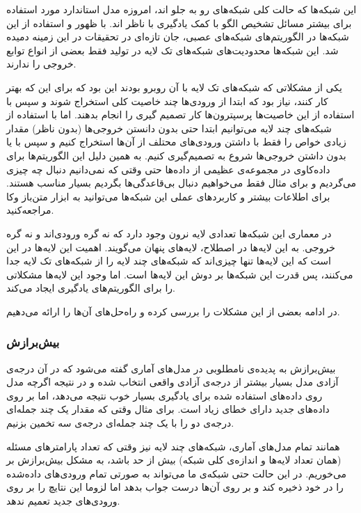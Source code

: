 \documentclass[11pt,a4paper,twocolumn]{article}
\begin{document}
این شبکه‌ها که حالت کلی شبکه‌های رو به جلو اند، امروزه مدل استاندارد مورد استفاده برای بیشتر مسائل تشخیص الگو با کمک یادگیری با ناظر اند. با ظهور و استفاده از این شبکه‌ها در الگوریتم‌های شبکه‌های عصبی، جان تازه‌ای در تحقیقات در این زمینه دمیده شد. این شبکه‌ها محدودیت‌های شبکه‌های تک لایه در تولید فقط بعضی از انواع توابع خروجی را ندارند.

یکی از مشکلاتی که شبکه‌های تک لایه با آن روبرو بودند این بود که برای این که بهتر کار کنند، نیاز بود که ابتدا از ورودی‌ها چند خاصیت کلی استخراج شوند و سپس با استفاده از این خاصیت‌ها پرسپترون‌ها کار تصمیم گیری را انجام بدهند. اما با استفاده از شبکه‌های چند لایه می‌توانیم ابتدا حتی بدون دانستن خروجی‌ها (بدون ناظر) مقدار زیادی خواص را فقط با داشتن ورودی‌های محتلف از آن‌ها استخراج کنیم و سپس با یا بدون داشتن خروجی‌ها شروع به تصمیم‌گیری کنیم. به همین دلیل این الگوریتم‌ها برای
داده‌کاوی
در مجموعه‌ی عظیمی از داده‌ها حتی وقتی که نمی‌دانیم دنبال چه چیزی می‌گردیم و برای مثال فقط می‌خواهیم دنبال بی‌قاعدگی‌ها بگردیم بسیار مناسب هستند. برای اطلاعات بیشتر و کاربرد‌های عملی این شبکه‌ها می‌توانید به ابزار متن‌باز
وکا
مراجعه‌کنید.

در معماری این شبکه‌ها تعدادی لایه نرون وجود دارد که نه گره‌ ورودی‌اند و نه گره‌ خروجی. به این لایه‌ها در اصطلاح،
لایه‌های پنهان
می‌گویند. اهمیت این لایه‌ها در این است که این لایه‌ها تنها چیزی‌اند که شبکه‌های چند لایه را از شبکه‌های تک لایه جدا می‌کنند،‌ پس قدرت این شبکه‌ها بر دوش این لایه‌ها است. اما وجود این لایه‌ها مشکلاتی را برای الگوریتم‌های یادگیری ایجاد می‌کند.

در ادامه بعضی از این مشکلات را بررسی کرده و راه‌حل‌های آن‌ها را ارائه می‌دهیم.

\subsubsection{بیش‌برازش}
بیش‌برازش 
به پدیده‌ی نامطلوبی در مدل‌های آماری گفته می‌شود که در آن درجه‌ی آزادی مدل بسیار بیشتر از درجه‌ی آزادی واقعی انتخاب شده و در نتیجه اگرچه مدل روی داده‌های استفاده شده برای یادگیری بسیار خوب نتیجه می‌دهد،‌ اما بر روی داده‌های جدید دارای خطای زیاد است.\cite{wiki-overfitting}
برای مثال وقتی که مقدار یک چند جمله‌ای درجه‌ی دو را با یک چند جمله‌ای درجه‌ی سه تخمین بزنیم.

همانند تمام مدل‌های آماری، شبکه‌های چند لایه نیز وقتی که تعداد پارامترهای مسئله (همان تعداد لایه‌ها و اندازه‌ی کلی شبکه) بیش از حد باشد، به مشکل بیش‌برازش بر می‌خوریم. در این حالت حتی شبکه‌ی ما می‌تواند به صورتی تمام ورودی‌های داده‌شده را در خود ذخیره کند و بر روی آن‌ها درست جواب بدهد اما لزوما این نتایچ را بر روی ورودی‌های جدید تعمیم ندهد.
\end{document}
